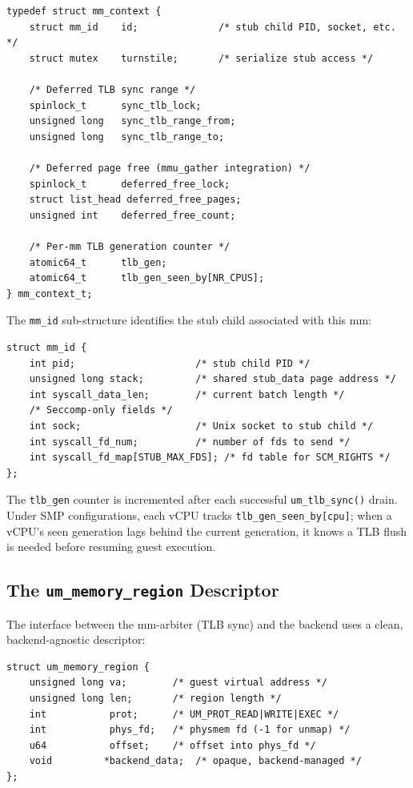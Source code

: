 \begin{lstlisting}[language=KernelC,caption={UML's \texttt{mm\_context\_t} (key fields)},label=lst:mm-context]
typedef struct mm_context {
    struct mm_id    id;              /* stub child PID, socket, etc. */
    struct mutex    turnstile;       /* serialize stub access */

    /* Deferred TLB sync range */
    spinlock_t      sync_tlb_lock;
    unsigned long   sync_tlb_range_from;
    unsigned long   sync_tlb_range_to;

    /* Deferred page free (mmu_gather integration) */
    spinlock_t      deferred_free_lock;
    struct list_head deferred_free_pages;
    unsigned int    deferred_free_count;

    /* Per-mm TLB generation counter */
    atomic64_t      tlb_gen;
    atomic64_t      tlb_gen_seen_by[NR_CPUS];
} mm_context_t;
\end{lstlisting}

The \texttt{mm\_id} sub-structure identifies the stub child associated with
this mm:

\begin{lstlisting}[language=KernelC,caption={The \texttt{mm\_id} structure},label=lst:mm-id]
struct mm_id {
    int pid;                     /* stub child PID */
    unsigned long stack;         /* shared stub_data page address */
    int syscall_data_len;        /* current batch length */
    /* Seccomp-only fields */
    int sock;                    /* Unix socket to stub child */
    int syscall_fd_num;          /* number of fds to send */
    int syscall_fd_map[STUB_MAX_FDS]; /* fd table for SCM_RIGHTS */
};
\end{lstlisting}

The \texttt{tlb\_gen} counter is incremented after each successful
\texttt{um\_tlb\_sync()} drain.  Under SMP configurations, each vCPU tracks
\texttt{tlb\_gen\_seen\_by[cpu]}; when a vCPU's seen generation lags behind the
current generation, it knows a TLB flush is needed before resuming guest
execution.

\subsection{The \texttt{um\_memory\_region} Descriptor}
\label{sec:impl-memory-region}

The interface between the mm-arbiter (TLB sync) and the backend uses a
clean, backend-agnostic descriptor:

\begin{lstlisting}[language=KernelC,caption={Memory region descriptor},label=lst:um-memory-region]
struct um_memory_region {
    unsigned long va;        /* guest virtual address */
    unsigned long len;       /* region length */
    int           prot;      /* UM_PROT_READ|WRITE|EXEC */
    int           phys_fd;   /* physmem fd (-1 for unmap) */
    u64           offset;    /* offset into phys_fd */
    void         *backend_data;  /* opaque, backend-managed */
};
\end{lstlisting}

